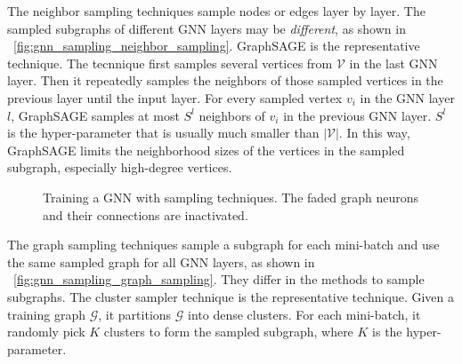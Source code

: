 The neighbor sampling techniques \cite{hamilton2017_graphsage, ying2018_pinsage, chen2018_fastgcn, chen2018_sgcn, huang2018_adap} sample nodes or edges layer by layer.
The sampled subgraphs of different GNN layers may be \emph{different}, as shown in \figurename~\ref{fig:gnn_sampling_neighbor_sampling}.
GraphSAGE \cite{hamilton2017_graphsage} is the representative technique.
The tecnnique first samples several vertices from $\mathcal{V}$ in the last GNN layer.
Then it repeatedly samples the neighbors of those sampled vertices in the previous layer until the input layer.
For every sampled vertex $v_i$ in the GNN layer $l$, GraphSAGE samples at most $S^l$ neighbors of $v_i$ in the previous GNN layer.
$S^l$ is the hyper-parameter that is usually much smaller than $|\mathcal{V}|$.
In this way, GraphSAGE limits the neighborhood sizes of the vertices in the sampled subgraph, especially high-degree vertices.

\begin{figure}
    \centering
    \caption{Training a GNN with sampling techniques. The faded graph neurons and their connections are inactivated.}
    \label{fig:gnn_sampling}
\end{figure}

The graph sampling techniques \cite{zeng2018_aesg, chiang2019_cluster_gcn, zeng2020_graphsaint} sample a subgraph for each mini-batch and use the same sampled graph for all GNN layers, as shown in \figurename~\ref{fig:gnn_sampling_graph_sampling}.
They differ in the methods to sample subgraphs.
The cluster sampler technique \cite{chiang2019_cluster_gcn} is the representative technique.
Given a training graph $\mathcal{G}$, it partitions $\mathcal{G}$ into dense clusters.
For each mini-batch, it randomly pick $K$ clusters to form the sampled subgraph, where $K$ is the hyper-parameter.


